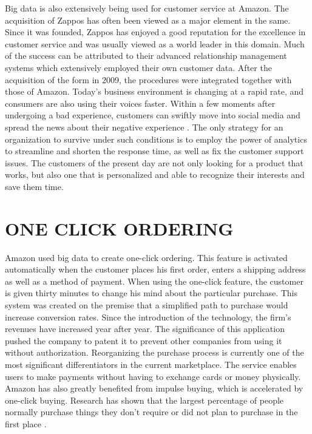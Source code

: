 \documentclass[sigconf]{acmart}
\begin{document}
Big data is also extensively being used for customer service at Amazon. The acquisition of Zappos has often been viewed as a major element in the same. Since it was founded, Zappos has enjoyed a good 
reputation for the excellence in customer service and was usually viewed as a world leader in this domain. Much of the success can be attributed to their advanced relationship management systems which 
extensively employed their own customer data. After the acquisition of the form in 2009, the procedures were integrated together with those of Amazon.  Today’s business environment is changing at a 
rapid rate, and consumers are also using their voices faster. Within a few moments after undergoing a bad experience, customers can swiftly move into social media and spread the news about their negative 
experience \cite{Bryant2008}. The only strategy for an organization to survive under such conditions is to employ the power of analytics to streamline and shorten the response time, as well as fix the 
customer support issues.  The customers of the present day are not only looking for a product that works, but also one that is personalized and able to recognize their interests and save them time.

\section{ONE CLICK ORDERING}
Amazon used big data to create one-click ordering. This feature is activated automatically when the customer places his first order, enters a shipping address as well as a method of payment. When using 
the one-click feature, the customer is given thirty minutes to change his mind about the particular purchase. This system was created on the premise that a simplified path to purchase would increase 
conversion rates. Since the introduction of the technology, the firm’s revenues have increased year after year. The significance of this application pushed the company to patent it to prevent other 
companies from using it without authorization. Reorganizing the purchase process is currently one of the most significant differentiators in the current marketplace.  The service enables users to make 
payments without having to exchange cards or money physically. Amazon has also greatly benefited from impulse buying, which is accelerated by one-click buying. Research has shown that the largest percentage 
of people normally purchase things they don’t require or did not plan to purchase in the first place \cite{Roy2002}.
\end{document}
